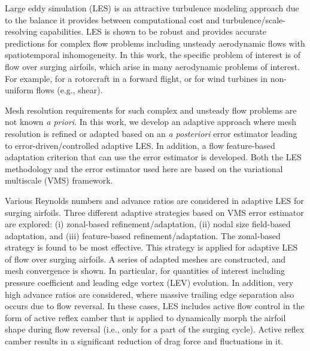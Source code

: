  
 
Large eddy simulation (LES) is an attractive turbulence modeling approach due to the balance it provides between computational cost and turbulence/scale-resolving capabilities. 
LES is shown to be robust and provides accurate predictions for complex flow problems including unsteady aerodynamic flows with spatiotemporal inhomogeneity.
In this work, the specific problem of interest is of flow over surging airfoils, which arise in many aerodynamic problems of interest. For example, for a rotorcraft in a forward flight, or for wind turbines in non-uniform flows (e.g., shear).


Mesh resolution requirements for such complex and unsteady flow problems are not known \textit{a priori}.
In this work, we develop an adaptive approach where mesh resolution is refined or adapted based on an \textit{a posteriori} error estimator leading to error-driven/controlled adaptive LES.
In addition, a flow feature-based adaptation criterion that can use the error estimator is developed.
Both the LES methodology and the error estimator used here are based on the variational multiscale (VMS) framework.

Various Reynolds numbers and advance ratios are considered in adaptive LES for surging airfoils.
Three different adaptive strategies based on VMS error estimator are explored: (i) zonal-based refinement/adaptation, (ii) nodal size field-based adaptation, and (iii) feature-based refinement/adaptation.
The zonal-based strategy is found to be most effective. This strategy is applied for adaptive LES of flow over surging airfoils. A series of adapted meshes are constructed, and mesh convergence is shown. In particular, for quantities of interest including pressure coefficient and leading edge vortex (LEV) evolution.
In addition, very high advance ratios are considered, where massive trailing edge separation also occurs due to flow reversal. In these cases, LES includes active flow control in the form of active reflex camber that is applied to dynamically morph the airfoil shape during flow reversal (i.e., only for a part of the surging cycle). Active reflex camber results in a significant reduction of drag force and fluctuations in it.








